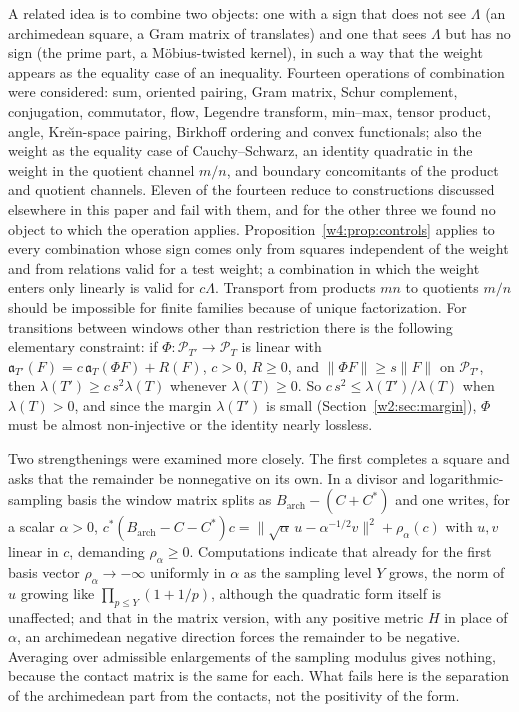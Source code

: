 \documentclass[11pt]{amsart}
\theoremstyle{definition}
\theoremstyle{remark}
\numberwithin{equation}{section}
\newcommand{\PT}{\mathcal{P}_T}                        %
\newcommand{\aT}{\mathfrak{a}_T}                       %
\begin{document}
\label{w4:fam:R2}%
A related idea is to combine two objects: one with a sign that does not see $\Lambda$ (an archimedean square, a Gram
matrix of translates) and one that sees $\Lambda$ but has no sign (the prime part, a M\"obius-twisted kernel), in such a
way that the weight appears as the equality case of an inequality. Fourteen operations of combination were considered:
sum, oriented pairing, Gram matrix, Schur complement, conjugation, commutator, flow, Legendre transform, min--max,
tensor product, angle, Kre\u{\i}n-space pairing, Birkhoff ordering and convex functionals; also the weight as the
equality case of Cauchy--Schwarz, an identity quadratic in the weight in the quotient channel $m/n$, and boundary
concomitants of the product and quotient channels. Eleven of the fourteen reduce to constructions discussed elsewhere in
this paper and fail with them, and for the other three we found no object to which the operation applies.
Proposition~\ref{w4:prop:controls} applies to every combination whose sign comes only from squares independent of the
weight and from relations valid for a test weight; a combination in which the weight enters only linearly is valid for
$c\Lambda$. Transport from products $mn$ to quotients $m/n$ should be impossible for finite families because of unique
factorization. For transitions between windows other than restriction there is the following elementary constraint: if
$\Phi:\mathcal P_{T'}\to\PT$ is linear with $\mathfrak a_{T'}(F)=c\,\aT(\Phi F)+R(F)$, $c>0$, $R\ge0$, and
$\|\Phi F\|\ge s\|F\|$ on $\mathcal P_{T'}$, then $\lambda(T')\ge c\,s^2\lambda(T)$ whenever $\lambda(T)\ge0$. So
$c\,s^2\le\lambda(T')/\lambda(T)$ when $\lambda(T)>0$, and since the margin $\lambda(T')$ is small
(Section~\ref{w2:sec:margin}), $\Phi$ must be almost non-injective or the identity nearly lossless.

Two strengthenings were examined more closely. The first completes a square and asks that the remainder be nonnegative
on its own. In a divisor and logarithmic-sampling basis the window matrix splits as $B_{\mathrm{arch}}-(C+C^*)$ and one
writes, for a scalar $\alpha>0$,
$c^*(B_{\mathrm{arch}}-C-C^*)c=\|\sqrt\alpha\,u-\alpha^{-1/2}v\|^2+\rho_\alpha(c)$ with $u,v$ linear in $c$, demanding
$\rho_\alpha\ge0$. Computations indicate that already for the first basis vector $\rho_\alpha\to-\infty$ uniformly in
$\alpha$ as the sampling level $Y$ grows, the norm of $u$ growing like $\prod_{p\le Y}(1+1/p)$, although the quadratic
form itself is unaffected; and that in the matrix version, with any positive metric $H$ in place of $\alpha$, an
archimedean negative direction forces the remainder to be negative. Averaging over admissible enlargements of the
sampling modulus gives nothing, because the contact matrix is the same for each. What fails here is the separation of the archimedean part from the contacts, not the positivity of the form.
\end{document}
